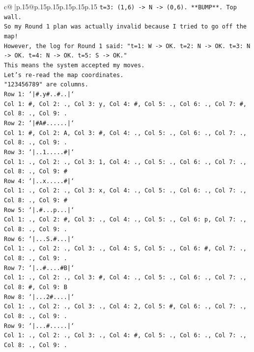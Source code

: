 \documentclass{article}
\begin{document}
{\begin{supertabular}{c@{$\;$}|p{.15\linewidth}@{}p{.15\linewidth}p{.15\linewidth}p{.15\linewidth}p{.15\linewidth}p{.15\linewidth}}
{{{\texttt{t=3: (1,6) {-}> N {-}> (0,6). **BUMP**. Top wall.} \\
\texttt{So my Round 1 plan was actually invalid because I tried to go off the map!} \\
\texttt{However, the log for Round 1 said: "t=1: W {-}> OK. t=2: N {-}> OK. t=3: N {-}> OK. t=4: N {-}> OK. t=5: S {-}> OK."} \\
\texttt{This means the system accepted my moves.} \\
\texttt{Let's re{-}read the map coordinates.} \\
\texttt{"123456789" are columns.} \\
\texttt{Row 1: `|\#.y\#..\#..|`} \\
\texttt{Col 1: \#, Col 2: ., Col 3: y, Col 4: \#, Col 5: ., Col 6: ., Col 7: \#, Col 8: ., Col 9: .} \\
\texttt{Row 2: `|\#A\#......|`} \\
\texttt{Col 1: \#, Col 2: A, Col 3: \#, Col 4: ., Col 5: ., Col 6: ., Col 7: ., Col 8: ., Col 9: .} \\
\texttt{Row 3: `|..1.....\#|`} \\
\texttt{Col 1: ., Col 2: ., Col 3: 1, Col 4: ., Col 5: ., Col 6: ., Col 7: ., Col 8: ., Col 9: \#} \\
\texttt{Row 4: `|..x.....\#|`} \\
\texttt{Col 1: ., Col 2: ., Col 3: x, Col 4: ., Col 5: ., Col 6: ., Col 7: ., Col 8: ., Col 9: \#} \\
\texttt{Row 5: `|.\#...p...|`} \\
\texttt{Col 1: ., Col 2: \#, Col 3: ., Col 4: ., Col 5: ., Col 6: p, Col 7: ., Col 8: ., Col 9: .} \\
\texttt{Row 6: `|...S.\#...|`} \\
\texttt{Col 1: ., Col 2: ., Col 3: ., Col 4: S, Col 5: ., Col 6: \#, Col 7: ., Col 8: ., Col 9: .} \\
\texttt{Row 7: `|..\#....\#B|`} \\
\texttt{Col 1: ., Col 2: ., Col 3: \#, Col 4: ., Col 5: ., Col 6: ., Col 7: ., Col 8: \#, Col 9: B} \\
\texttt{Row 8: `|...2\#....|`} \\
\texttt{Col 1: ., Col 2: ., Col 3: ., Col 4: 2, Col 5: \#, Col 6: ., Col 7: ., Col 8: ., Col 9: .} \\
\texttt{Row 9: `|...\#.....|`} \\
\texttt{Col 1: ., Col 2: ., Col 3: ., Col 4: \#, Col 5: ., Col 6: ., Col 7: ., Col 8: ., Col 9: .} \\
}}}
\end{supertabular}}
\end{document}
